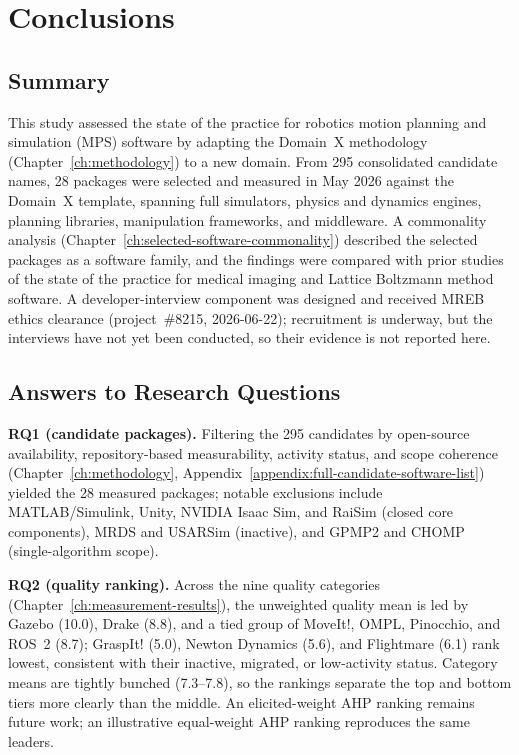 \chapter{Conclusions}
\label{ch:conclusions}

\section{Summary}
\label{sec:conclusion-summary}

This study assessed the state of the practice for robotics motion planning and
simulation (MPS) software by adapting the Domain~X methodology
(Chapter~\ref{ch:methodology}) to a new domain. From 295 consolidated candidate
names, 28 packages were selected and measured in May 2026 against the Domain~X
template, spanning full simulators, physics and dynamics engines, planning
libraries, manipulation frameworks, and middleware. A commonality analysis
(Chapter~\ref{ch:selected-software-commonality}) described the selected packages
as a software family, and the findings were compared with prior studies of the
state of the practice for medical imaging and Lattice Boltzmann method software.
A developer-interview component was designed and received MREB ethics clearance
(project~\#8215, 2026-06-22); recruitment is underway, but the interviews have
not yet been conducted, so their evidence is not reported here.

\section{Answers to Research Questions}
\label{sec:answers-research-questions}

\textbf{RQ1 (candidate packages).} Filtering the
295 candidates by open-source availability, repository-based measurability,
activity status, and scope coherence (Chapter~\ref{ch:methodology},
Appendix~\ref{appendix:full-candidate-software-list}) yielded the 28 measured packages; notable
exclusions include MATLAB/Simulink, Unity, NVIDIA Isaac Sim, and RaiSim (closed
core components), MRDS and USARSim (inactive), and GPMP2 and CHOMP
(single-algorithm scope).

\textbf{RQ2 (quality ranking).} Across the nine quality categories
(Chapter~\ref{ch:measurement-results}), the unweighted quality mean is led by
Gazebo (10.0), Drake (8.8), and a tied group of MoveIt!, OMPL, Pinocchio, and
ROS~2 (8.7); GraspIt! (5.0), Newton Dynamics (5.6), and Flightmare (6.1) rank
lowest, consistent with their inactive, migrated, or low-activity status. Category
means are tightly bunched (7.3--7.8), so the rankings separate the top and
bottom tiers more clearly than the middle. An elicited-weight AHP ranking remains future work; an illustrative
equal-weight AHP ranking reproduces the same leaders.

